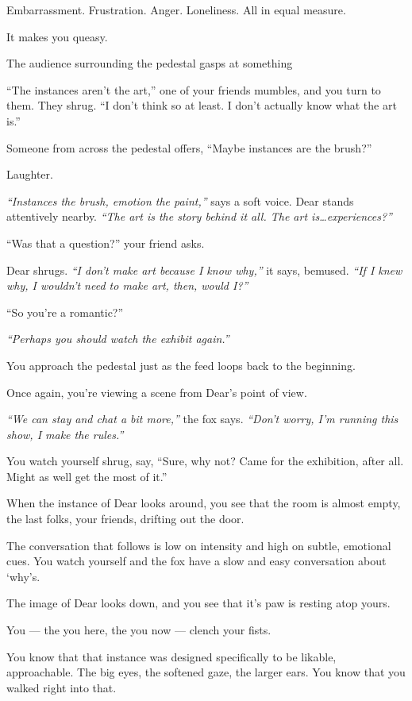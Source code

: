 Embarrassment. Frustration. Anger. Loneliness. All in equal measure.

It makes you queasy.

The audience surrounding the pedestal gasps at something

``The instances aren't the art,'' one of your friends mumbles, and you turn to them. They shrug. ``I don't think so at least. I don't actually know what the art is.''

Someone from across the pedestal offers, ``Maybe instances are the brush?''

Laughter.

\emph{``Instances the brush, emotion the paint,''} says a soft voice. Dear stands attentively nearby. \emph{``The art is the story behind it all. The art is\ldots{}experiences?''}

``Was that a question?'' your friend asks.

Dear shrugs. \emph{``I don't make art because I know why,''} it says, bemused. \emph{``If I knew why, I wouldn't need to make art, then, would I?''}

``So you're a romantic?''

\emph{``Perhaps you should watch the exhibit again.''}

You approach the pedestal just as the feed loops back to the beginning.

Once again, you're viewing a scene from Dear's point of view.

\emph{``We can stay and chat a bit more,''} the fox says. \emph{``Don't worry, I'm running this show, I make the rules.''}

You watch yourself shrug, say, ``Sure, why not? Came for the exhibition, after all. Might as well get the most of it.''

When the instance of Dear looks around, you see that the room is almost empty, the last folks, your friends, drifting out the door.

The conversation that follows is low on intensity and high on subtle, emotional cues. You watch yourself and the fox have a slow and easy conversation about `why's.

The image of Dear looks down, and you see that it's paw is resting atop yours.

You --- the you here, the you now --- clench your fists.

You know that that instance was designed specifically to be likable, approachable. The big eyes, the softened gaze, the larger ears. You know that you walked right into that.

